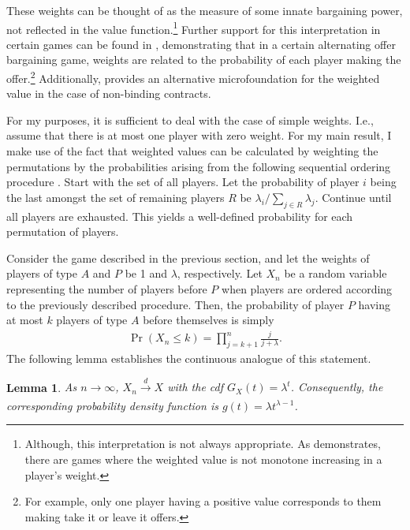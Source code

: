 \documentclass[a4paper]{article}
\newtheorem{lemma}{Lemma}
\begin{document}
These weights can be thought of as the measure of some innate bargaining power, not reflected in the value function.\footnote{
    Although, this interpretation is not always appropriate.
    As \textcite{owen1968communications} demonstrates, there are games where the weighted value is not monotone increasing in a player's weight.
}
Further support for this interpretation in certain games can be found in \textcite{hart1996bargaining}, demonstrating that in a certain alternating offer bargaining game, weights are related to the probability of each player making the offer.\footnote{
    For example, only one player having a positive value corresponds to them making take it or leave it offers.
}
Additionally, \textcite{stole1996intra} provides an alternative microfoundation for the weighted value in the case of non-binding contracts.

For my purposes, it is sufficient to deal with the case of simple weights.
I.e., assume that there is at most one player with zero weight.
For my main result, I make use of the fact that weighted values can be calculated by weighting the permutations by the probabilities arising from the following sequential ordering procedure \parencite{kalai1987weighted}.
Start with the set of all players.
Let the probability of player $i$ being the last amongst the set of remaining players $R$ be $\lambda_i / \sum_{j \in R} \lambda_j$.
Continue until all players are exhausted.
This yields a well-defined probability for each permutation of players.

Consider the game described in the previous section, and let the weights of players of type $A$ and $P$ be 1 and $\lambda$, respectively.
Let $X_n$ be a random variable representing the number of players before $P$ when players are ordered according to the previously described procedure.
Then, the probability of player $P$ having at most $k$ players of type $A$ before themselves is simply
\begin{align}
    \label{eq:entry_distr_discrete}
    \Pr(X_n \leq k) = \prod_{j=k+1}^n \frac{j}{j + \lambda}.
\end{align}
The following lemma establishes the continuous analogue of this statement.
\begin{lemma}
    \label{lem:entry_distr}
     As $n \to \infty$, $X_n \xrightarrow[]{d} X$ with the cdf $G_X(t) = \lambda^t$.
     Consequently, the corresponding probability density function is $g(t) = \lambda t^{\lambda - 1}$.
\end{lemma}
\end{document}
